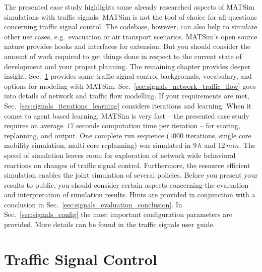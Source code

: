 The presented case study highlights some already researched aspects of MATSim simulations with traffic signals. 
MATSim is not the tool of choice for all questions concerning traffic signal control. 
The codebase, however, can also help to simulate other use cases, e.g.~evacuation or air transport scenarios. 
MATSim's open source nature provides hooks and interfaces for extension. 
But you should consider the amount of work required to get things done in respect to the current state of development and your project planning. 
The remaining chapter provides deeper insight.  
Sec.~\ref{sec:signals_traffic_signal_control} provides some traffic signal control backgrounds, vocabulary, and options for modeling with MATSim.  
Sec.~\ref{sec:signals_network_traffic_flow} goes into details of network and traffic flow modelling. 
If your requirements are met, Sec.~\ref{sec:signals_iterations_learning} considers iterations and learning. 
When it comes to agent based learning, MATSim is very fast -- the presented case study requires on average~$17$ seconds computation time per iteration -- for scoring, replanning, and output. One complete run sequence ($1000$ iterations, single core mobility simulation, multi core replanning) was simulated in $9 \, h$ and $12 \, min$. 
The speed of simulation leaves room for exploration of network wide behavioral reactions on changes of traffic signal control. 
Furthermore, the resource efficient simulation enables the joint simulation of several policies. 
Before you present your results to public, you should consider certain aspects concerning the  evaluation and interpretation of simulation results. 
Hints are provided in conjunction with a conclusion in Sec.~\ref{sec:signals_evaluation_conclusion}. 
In Sec.~\ref{sec:signals_config} the most important configuration parameters are provided. 
More details can be found in the traffic signals user guide. 


\section{Traffic Signal Control}
\label{sec:signals_traffic_signal_control}

